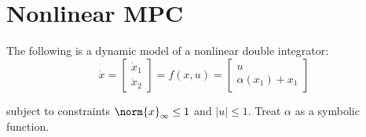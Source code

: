 \setcounter{section}{0}
\section{Nonlinear MPC}

The following is a dynamic model of a nonlinear double integrator:
\begin{equation*}
    \dot{x} = \begin{bmatrix}
        \dot{x}_1 \\
        \dot{x}_2
    \end{bmatrix} = f(x,u) = \begin{bmatrix}
        u \\
        \alpha(x_1) + x_1
    \end{bmatrix}
\end{equation*}

subject to constraints $\norm{x}_{\infty} \leq 1$ and $|u| \leq 1$. Treat $\alpha$ as a symbolic function.

